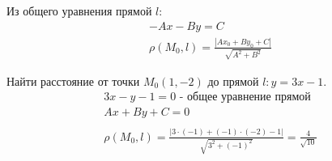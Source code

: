 Из общего уравнения прямой $l$:
\begin{gather*}
  -Ax - By = C \\
  \boxed{\rho(M_0, l) = \frac{|A x_0 + B y_0 + C|}{\sqrt{A^2 + B^2}}}
\end{gather*}

\begin{eg}
  Найти расстояние от точки $M_0 (1, -2)$ до прямой $l: y = 3x - 1$.
  \begin{gather*}
    3x - y - 1 = 0 \text{ - общее уравнение прямой} \\
    Ax + By + C = 0 \\
    \\
    \rho (M_0, l) = \frac{|3 \cdot (-1) + (-1) \cdot (-2) - 1|}{\sqrt{3^2 + (-1)^2} } = \frac{4}{\sqrt{10} }
  \end{gather*}
\end{eg}

